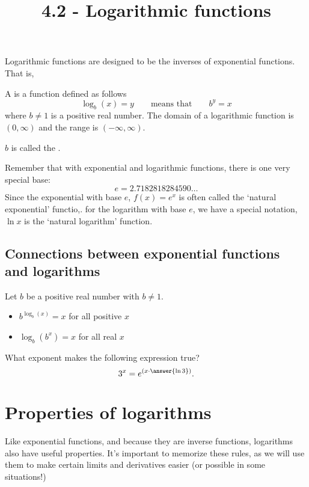 \documentclass{ximera}
\title{4.2 - Logarithmic functions}
\begin{document}
\begin{abstract}

\end{abstract}
\maketitle

Logarithmic functions are designed to be the inverses of exponential functions. That is, 

\begin{definition}
  A  is a function defined as follows
  \[
  \log_b(x) = y \qquad\text{means that}\qquad b^y = x
  \]
  where  $b\ne 1$ is a positive real number. The domain of a
  logarithmic function is $(0,\infty)$ and the range is $(- \infty, \infty)$.
\end{definition}

$b$ is called the .

Remember that with exponential and logarithmic functions, there is one very special
base:
\[ e = 2.7182818284590\ldots \]
Since the exponential with base $e$,
$f(x) = e^x$ is often called the `natural exponential' functio,.  for the logarithm with base $e$,
we have a special notation, $\ln x$ is the `natural logarithm' function.  


\subsection{Connections between exponential functions and logarithms}

Let $b$ be a positive real number with $b\ne 1$.
\begin{itemize}
\item $b^{\log_b(x)} = x$ for all positive $x$
\item $\log_b(b^x) = x$ for all real $x$
\end{itemize}

\begin{question}
  What exponent makes the following expression true?
  \[
  3^x = e^{\left( x \cdot \answer{\ln 3} \right)}.
  \]
\end{question}


\section{Properties of logarithms}

Like exponential functions, and because they are inverse functions, logarithms also have useful properties. It's important to memorize these rules, as we will use them to make certain limits and derivatives easier (or possible in some situations!)
\end{document}
